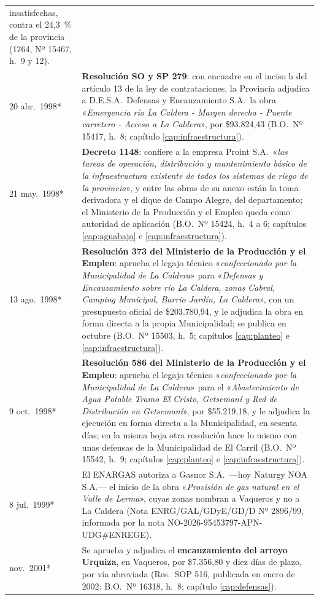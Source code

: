 \begin{longtable}{@{}p{2.7cm}p{10.3cm}@{}}
insatisfechas, contra el 24,3~\% de la provincia (1764, Nº 15467, h.\ 9 y 12). \\
20 abr.\ 1998* & \textbf{Resolución SO y SP 279}: con encuadre en el inciso h del artículo 13 de la ley de contrataciones, la Provincia adjudica a D.E.S.A.\ Defensas y Encauzamiento S.A.\ la obra «\textit{Emergencia río La Caldera - Margen derecha - Puente carretero - Acceso a La Caldera}», por \$93.824,43 (B.O.\ Nº 15417, h.\ 8; capítulo \ref{cap:infraestructura}). \\
21 may.\ 1998* & \textbf{Decreto 1148}: confiere a la empresa Proint S.A.\ «\textit{las tareas de operación, distribución y mantenimiento básico de la infraestructura existente de todos los sistemas de riego de la provincia}», y entre las obras de su anexo están la toma derivadora y el dique de Campo Alegre, del departamento; el Ministerio de la Producción y el Empleo queda como autoridad de aplicación (B.O.\ Nº 15424, h.\ 4 a 6; capítulos \ref{cap:aguabaja} e \ref{cap:infraestructura}). \\
13 ago.\ 1998* & \textbf{Resolución 373 del Ministerio de la Producción y el Empleo}: aprueba el legajo técnico «\textit{confeccionado por la Municipalidad de La Caldera}» para «\textit{Defensas y Encauzamiento sobre río La Caldera, zonas Cabral, Camping Municipal, Barrio Jardín, La Caldera}», con un presupuesto oficial de \$203.780,94, y le adjudica la obra en forma directa a la propia Municipalidad; se publica en octubre (B.O.\ Nº 15503, h.\ 5; capítulos \ref{cap:planteo} e \ref{cap:infraestructura}). \\
9 oct.\ 1998* & \textbf{Resolución 586 del Ministerio de la Producción y el Empleo}: aprueba el legajo técnico «\textit{confeccionado por la Municipalidad de La Caldera}» para el «\textit{Abastecimiento de Agua Potable Tramo El Cristo, Getsemaní y Red de Distribución en Getsemaní}», por \$55.219,18, y le adjudica la ejecución en forma directa a la Municipalidad, en sesenta días; en la misma hoja otra resolución hace lo mismo con unas defensas de la Municipalidad de El Carril (B.O.\ Nº 15542, h.\ 9; capítulos \ref{cap:planteo} e \ref{cap:infraestructura}). \\
8 jul.\ 1999* & El ENARGAS autoriza a Gasnor S.A.\ ---hoy Naturgy NOA S.A.--- el inicio de la obra «\textit{Provisión de gas natural en el Valle de Lerma}», cuyas zonas nombran a Vaqueros y no a La Caldera (Nota ENRG/GAL/GDyE/GD/D Nº 2896/99, informada por la nota NO-2026-95453797-APN-UDG\#ENREGE). \\
nov.\ 2001* & Se aprueba y adjudica el \textbf{encauzamiento del arroyo Urquiza\index{Urquiza, Francisco S.}}, en Vaqueros, por \$7.356,80 y diez días de plazo, por vía abreviada (Res.\ SOP 516, publicada en enero de 2002: B.O.\ Nº 16318, h.\ 8; capítulo \ref{cap:defensas}). \\

\end{longtable}

